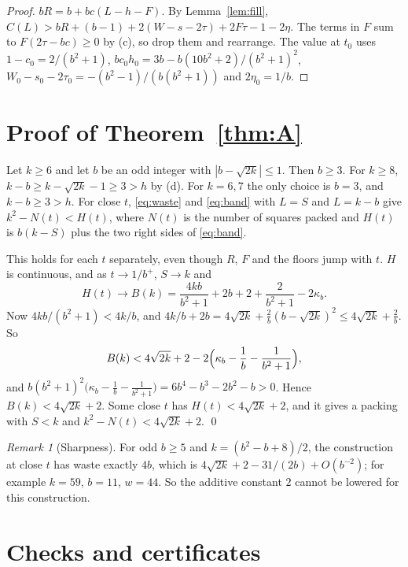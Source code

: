 \documentclass[11pt,letterpaper]{amsart}
\theoremstyle{plain}
\theoremstyle{remark}
\newtheorem*{remark}{Remark}
\begin{document}
\begin{proof}
$bR=b+bc(L-h-F)$. By Lemma~\ref{lem:fill}, $C(L)>bR+(b-1)+2(W-s-2\tau)+2F\tau-1-2\eta$. The terms in $F$ sum to $F(2\tau-bc)\ge0$ by (c), so drop them and rearrange. The value at $t_0$ uses $1-c_0=2/(b^2+1)$, $bc_0h_0=3b-b(10b^2+2)/(b^2+1)^2$, $W_0-s_0-2\tau_0=-(b^2-1)/(b(b^2+1))$ and $2\eta_0=1/b$.
\end{proof}

\section{Proof of Theorem~\ref{thm:A}}

Let $k\ge6$ and let $b$ be an odd integer with $|b-\sqrt{2k}|\le1$. Then $b\ge3$. For $k\ge8$, $k-b\ge k-\sqrt{2k}-1\ge3>h$ by (d). For $k=6,7$ the only choice is $b=3$, and $k-b\ge3>h$. For close $t$, \eqref{eq:waste} and \eqref{eq:band} with $L=S$ and $L=k-b$ give $k^2-N(t)<H(t)$, where $N(t)$ is the number of squares packed and $H(t)$ is $b(k-S)$ plus the two right sides of \eqref{eq:band}.

This holds for each $t$ separately, even though $R$, $F$ and the floors jump with $t$. $H$ is continuous, and as $t\to1/b^+$, $S\to k$ and
\[
H(t)\to B(k)=\frac{4kb}{b^2+1}+2b+2+\frac{2}{b^2+1}-2\kappa_b.
\]
Now $4kb/(b^2+1)<4k/b$, and $4k/b+2b=4\sqrt{2k}+\frac2b(b-\sqrt{2k})^2\le4\sqrt{2k}+\frac2b$. So
\[
B(k)<4\sqrt{2k}+2-2\Bigl(\kappa_b-\frac1b-\frac1{b^2+1}\Bigr),
\]
and $b(b^2+1)^2\bigl(\kappa_b-\frac1b-\frac1{b^2+1}\bigr)=6b^4-b^3-2b^2-b>0$. Hence $B(k)<4\sqrt{2k}+2$. Some close $t$ has $H(t)<4\sqrt{2k}+2$, and it gives a packing with $S<k$ and $k^2-N(t)<4\sqrt{2k}+2$. \qed

\begin{remark}[Sharpness]
For odd $b\ge5$ and $k=(b^2-b+8)/2$, the construction at close $t$ has waste exactly $4b$, which is $4\sqrt{2k}+2-31/(2b)+O(b^{-2})$; for example $k=59$, $b=11$, $w=44$. So the additive constant $2$ cannot be lowered for this construction.
\end{remark}

\section{Checks and certificates}
\end{document}
